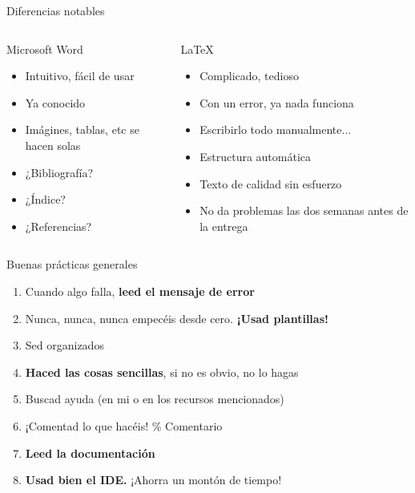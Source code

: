 \documentclass[12pt]{beamer}
\begin{document}
\begin{frame}[t]{Diferencias notables}
	\begin{columns}[t]
		\begin{column}{0.4\textwidth}
			Microsoft Word
			\begin{itemize}
				\item Intuitivo, fácil de usar
				\item Ya conocido
				\item Imágines, tablas, etc se hacen solas \\
				\hrulefill
				\item ¿Bibliografía?
				\item ¿Índice?
				\item ¿Referencias?
			\end{itemize}
		\end{column}
		\begin{column}{0.55\textwidth}
			\LaTeX
			\begin{itemize}
				\item Complicado, tedioso
				\item Con un error, ya nada funciona
				\item Escribirlo todo manualmente...\\
				\hrulefill
				\item Estructura automática
				\item Texto de calidad sin esfuerzo
				\item No da problemas las dos semanas antes de la entrega
			\end{itemize}
		\end{column}
	\end{columns}
\end{frame}

\begin{frame}{Buenas prácticas generales}
	\large
	\begin{enumerate}
		\item Cuando algo falla, \textbf{leed el mensaje de error}
		\item Nunca, nunca, nunca empecéis desde cero. \textbf{¡Usad plantillas!}
		\item Sed organizados
		\item \textbf{Haced las cosas sencillas}, si no es obvio, no lo hagas
		\item Buscad ayuda (en mi o en los recursos mencionados)
		\item ¡Comentad lo que hacéis! \% Comentario
		\item \textbf{Leed la documentación}
		\item \textbf{Usad bien el IDE.} ¡Ahorra un montón de tiempo! 
	\end{enumerate}
\end{frame}
\end{document}
